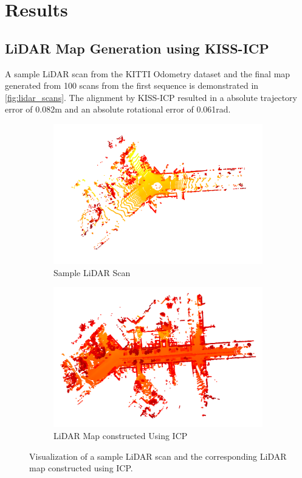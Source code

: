 \section{Results}
\label{sec:results}

\subsection{LiDAR Map Generation using KISS-ICP}

A sample LiDAR scan from the KITTI Odometry dataset and the final map generated from 100 scans from the first sequence is demonstrated in \autoref{fig:lidar_scans}. The alignment by KISS-ICP resulted in a absolute trajectory error of 0.082m and an absolute rotational error of 0.061rad.

\begin{figure}[t]
    \centering
    \begin{subfigure}[t]{0.49\textwidth}
        \centering
        \includegraphics[width=\textwidth]{figures/lidar_frame.png}
        \caption{Sample LiDAR Scan}
    \end{subfigure}
    \begin{subfigure}[t]{0.49\textwidth}
        \centering
        \includegraphics[width=\textwidth]{figures/lidar_map.png}
        \caption{LiDAR Map constructed Using ICP}
    \end{subfigure}
    \caption{Visualization of a sample LiDAR scan and the corresponding LiDAR map constructed using ICP.}
    \label{fig:lidar_scans}
\end{figure}

